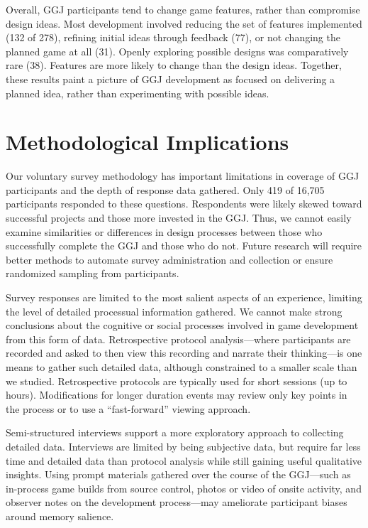 \documentclass{sig-alternate}
\begin{document}
Overall, GGJ participants tend to change game features, rather than compromise design ideas. Most development involved reducing the set of features implemented (132 of 278), refining initial ideas through feedback (77), or not changing the planned game at all (31). Openly exploring possible designs was comparatively rare (38). Features are more likely to change than the design ideas. Together, these results paint a picture of GGJ development as focused on delivering a planned idea, rather than experimenting with possible ideas.

\section{Methodological Implications}
Our voluntary survey methodology has important limitations in coverage of GGJ participants and the depth of response data gathered. Only 419 of 16,705 participants responded to these questions. Respondents were likely skewed toward successful projects and those more invested in the GGJ. Thus, we cannot easily examine similarities or differences in design processes between those who successfully complete the GGJ and those who do not. Future research will require better methods to automate survey administration and collection or ensure randomized sampling from participants.

Survey responses are limited to the most salient aspects of an experience, limiting the level of detailed processual information gathered. We cannot make strong conclusions about the cognitive or social processes involved in game development from this form of data. Retrospective protocol analysis---where participants are recorded and asked to then view this recording and narrate their thinking---is one means to gather such detailed data, although constrained to a smaller scale than we studied. Retrospective protocols are typically used for short sessions (up to hours). Modifications for longer duration events may review only key points in the process or to use a ``fast-forward'' viewing approach. 

Semi-structured interviews support a more exploratory approach to collecting detailed data. Interviews are limited by being subjective data, but require far less time and detailed data than protocol analysis while still gaining useful qualitative insights. Using prompt materials gathered over the course of the GGJ---such as in-process game builds from source control, photos or video of onsite activity, and observer notes on the development process---may ameliorate participant biases around memory salience.
\end{document}
